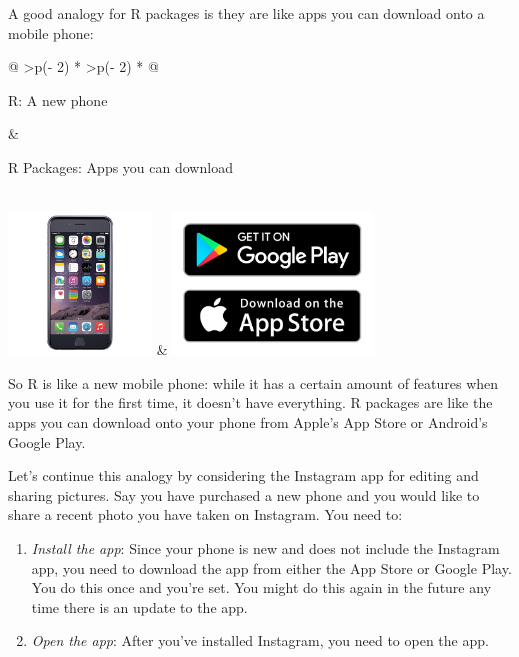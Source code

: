 \documentclass[
  letterpaper,
  DIV=11,
  numbers=noendperiod]{scrreprt}
\theoremstyle{definition}
\theoremstyle{remark}
\begin{document}
A good analogy for R packages is they are like apps you can download
onto a mobile phone:

\begin{longtable}[]{@{}
  >{\centering\arraybackslash}p{(\columnwidth - 2\tabcolsep) * }
  >{\centering\arraybackslash}p{(\columnwidth - 2\tabcolsep) * }@{}}
\toprule\noalign{}
\begin{minipage}[b]{\linewidth}\centering
R: A new phone
\end{minipage} & \begin{minipage}[b]{\linewidth}\centering
R Packages: Apps you can download
\end{minipage} \\
\midrule\noalign{}
\endhead
\bottomrule\noalign{}
\endlastfoot
\includegraphics[width=\textwidth,height=1.5in]{images/iphone.jpg} &
\includegraphics[width=\textwidth,height=1.5in]{images/apps.jpg} \\
\end{longtable}

So R is like a new mobile phone: while it has a certain amount of
features when you use it for the first time, it doesn't have everything.
R packages are like the apps you can download onto your phone from
Apple's App Store or Android's Google Play.

Let's continue this analogy by considering the Instagram app for editing
and sharing pictures. Say you have purchased a new phone and you would
like to share a recent photo you have taken on Instagram. You need to:

\begin{enumerate}
\def\labelenumi{\arabic{enumi}.}
\item
  \emph{Install the app}: Since your phone is new and does not include
  the Instagram app, you need to download the app from either the App
  Store or Google Play. You do this once and you're set. You might do
  this again in the future any time there is an update to the app.
\item
  \emph{Open the app}: After you've installed Instagram, you need to
  open the app.
\end{enumerate}
\end{document}
